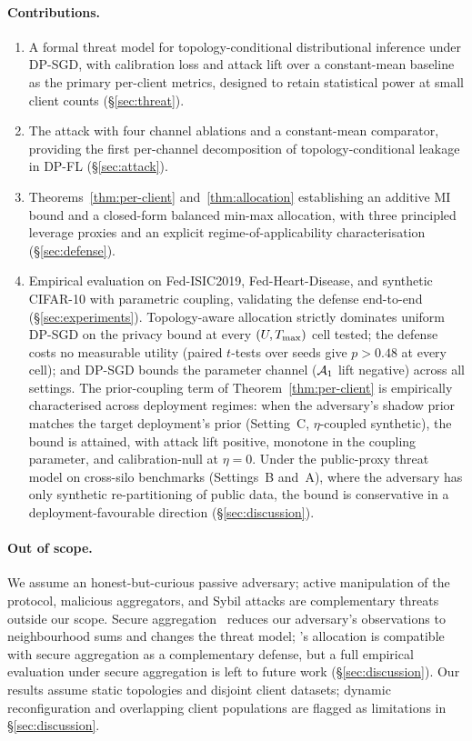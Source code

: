 \paragraph{Contributions.}
\begin{enumerate}[leftmargin=*,topsep=2pt,itemsep=2pt]
\item A formal threat model for topology-conditional distributional
  inference under DP-SGD, with calibration loss and attack lift over a
  constant-mean baseline as the primary per-client metrics, designed
  to retain statistical power at small client counts
  (\S\ref{sec:threat}).
\item The \TADI attack with four channel ablations and a constant-mean
  comparator, providing the first per-channel decomposition of
  topology-conditional leakage in DP-FL (\S\ref{sec:attack}).
\item Theorems~\ref{thm:per-client} and~\ref{thm:allocation}
  establishing an additive MI bound and a closed-form balanced min-max
  allocation, with three principled leverage proxies and an explicit
  regime-of-applicability characterisation (\S\ref{sec:defense}).
\item Empirical evaluation on Fed-ISIC2019, Fed-Heart-Disease, and
  synthetic CIFAR-10 with parametric coupling, validating the defense
  end-to-end (\S\ref{sec:experiments}). Topology-aware allocation
  strictly dominates uniform DP-SGD on the privacy bound at every
  $(U, T_{\max})$ cell tested; the defense costs no measurable utility
  (paired $t$-tests over seeds give $p > 0.48$ at every cell); and
  DP-SGD bounds the \TADI parameter channel ($\mathcal{A}_1$ lift negative)
  across all settings. The prior-coupling term of
  Theorem~\ref{thm:per-client} is empirically characterised across
  deployment regimes: when the adversary's shadow prior matches the
  target deployment's prior (Setting~C, $\eta$-coupled synthetic), the
  bound is attained, with attack lift positive, monotone in the
  coupling parameter, and calibration-null at $\eta=0$. Under the
  public-proxy threat model on cross-silo benchmarks (Settings~B
  and~A), where the adversary has only synthetic re-partitioning of
  public data, the bound is conservative in a deployment-favourable
  direction (\S\ref{sec:discussion}).
\end{enumerate}

\paragraph{Out of scope.}
We assume an honest-but-curious passive adversary; active manipulation
of the protocol, malicious aggregators, and Sybil attacks are
complementary threats outside our scope.
Secure aggregation~\cite{bonawitz2017secagg} reduces our adversary's
observations to neighbourhood sums and changes the threat model;
\Fulcrum's allocation is compatible with secure aggregation as a
complementary defense, but a full empirical evaluation under secure
aggregation is left to future work
(\S\ref{sec:discussion}). Our results assume static topologies and
disjoint client
datasets; dynamic reconfiguration and overlapping client populations
are flagged as limitations in \S\ref{sec:discussion}.
